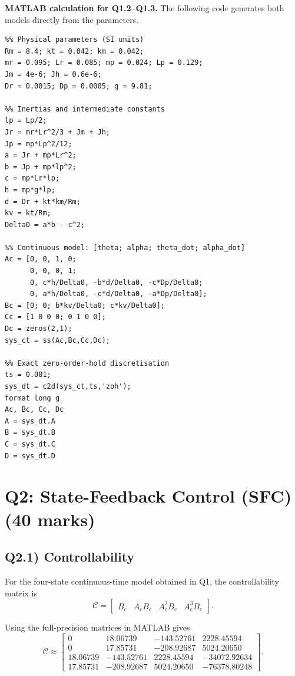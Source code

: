 \documentclass[11pt,a4paper]{article}
\begin{document}
\textbf{MATLAB calculation for Q1.2--Q1.3.}
The following code generates both models directly from the parameters.
\begin{lstlisting}
%% Physical parameters (SI units)
Rm = 8.4; kt = 0.042; km = 0.042;
mr = 0.095; Lr = 0.085; mp = 0.024; Lp = 0.129;
Jm = 4e-6; Jh = 0.6e-6;
Dr = 0.0015; Dp = 0.0005; g = 9.81;

%% Inertias and intermediate constants
lp = Lp/2;
Jr = mr*Lr^2/3 + Jm + Jh;
Jp = mp*Lp^2/12;
a = Jr + mp*Lr^2;
b = Jp + mp*lp^2;
c = mp*Lr*lp;
h = mp*g*lp;
d = Dr + kt*km/Rm;
kv = kt/Rm;
Delta0 = a*b - c^2;

%% Continuous model: [theta; alpha; theta_dot; alpha_dot]
Ac = [0, 0, 1, 0;
      0, 0, 0, 1;
      0, c*h/Delta0, -b*d/Delta0, -c*Dp/Delta0;
      0, a*h/Delta0, -c*d/Delta0, -a*Dp/Delta0];
Bc = [0; 0; b*kv/Delta0; c*kv/Delta0];
Cc = [1 0 0 0; 0 1 0 0];
Dc = zeros(2,1);
sys_ct = ss(Ac,Bc,Cc,Dc);

%% Exact zero-order-hold discretisation
ts = 0.001;
sys_dt = c2d(sys_ct,ts,'zoh');
format long g
Ac, Bc, Cc, Dc
A = sys_dt.A
B = sys_dt.B
C = sys_dt.C
D = sys_dt.D
\end{lstlisting}


\clearpage
\section*{Q2: State-Feedback Control (SFC) \hfill (40 marks)}

\subsection*{Q2.1) Controllability}
For the four-state continuous-time model obtained in Q1, the controllability matrix is
\begin{equation}
    \mathcal{C}
    =
    \begin{bmatrix}
        B_c & A_cB_c & A_c^2B_c & A_c^3B_c
    \end{bmatrix}.
\end{equation}

Using the full-precision matrices in MATLAB gives
\begin{equation}
\mathcal{C} \approx
\begin{bmatrix}
0 & 18.06739 & -143.52761 & 2228.45594 \\
0 & 17.85731 & -208.92687 & 5024.20650 \\
18.06739 & -143.52761 & 2228.45594 & -34072.92634 \\
17.85731 & -208.92687 & 5024.20650 & -76378.80248
\end{bmatrix}.
\end{equation}
\end{document}
